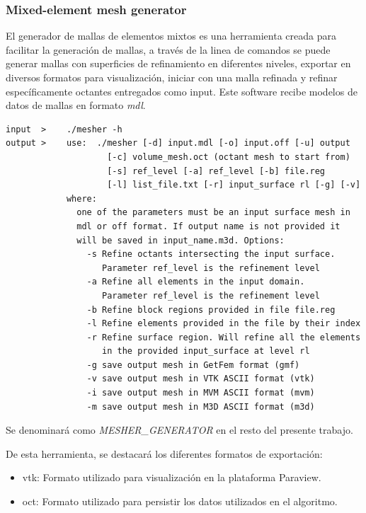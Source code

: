 \subsubsection{Mixed-element mesh generator} \label{section:mesh_generator_definition}

El generador de mallas de elementos mixtos \cite{lobos2015mixed} es una herramienta creada para facilitar la generación de mallas, a través de la linea de comandos se puede generar mallas con superficies de refinamiento en diferentes niveles, exportar en diversos formatos para visualización, iniciar con una malla refinada y refinar específicamente octantes entregados como input.
Este software recibe modelos de datos de mallas en formato \textit{mdl}.

\begin{lstlisting}[style=Console,caption={Opciones de mesher generator.\\ Fuente: Elaboración propia.}]
input  >    ./mesher -h
output >    use:  ./mesher [-d] input.mdl [-o] input.off [-u] output
                    [-c] volume_mesh.oct (octant mesh to start from)
                    [-s] ref_level [-a] ref_level [-b] file.reg 
                    [-l] list_file.txt [-r] input_surface rl [-g] [-v]
            where:
              one of the parameters must be an input surface mesh in
              mdl or off format. If output name is not provided it
              will be saved in input_name.m3d. Options:
                -s Refine octants intersecting the input surface.
                   Parameter ref_level is the refinement level
                -a Refine all elements in the input domain.
                   Parameter ref_level is the refinement level
                -b Refine block regions provided in file file.reg
                -l Refine elements provided in the file by their index
                -r Refine surface region. Will refine all the elements
                   in the provided input_surface at level rl
                -g save output mesh in GetFem format (gmf)
                -v save output mesh in VTK ASCII format (vtk)
                -i save output mesh in MVM ASCII format (mvm)
                -m save output mesh in M3D ASCII format (m3d)
\end{lstlisting}

Se denominará como \textit{MESHER\_GENERATOR} en el resto del presente trabajo.

De esta herramienta, se destacará los diferentes formatos de exportación:

\begin{itemize}
	\item vtk: Formato utilizado para visualización en la plataforma Paraview.
	\item oct: Formato utilizado para persistir los datos utilizados en el algoritmo.
\end{itemize}

